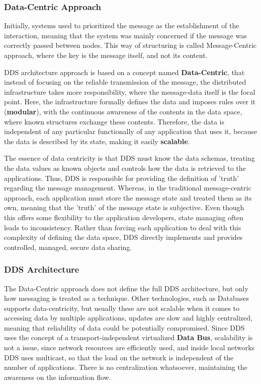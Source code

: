 \subsubsection{Data-Centric Approach}

Initially, systems used to prioritized the message as the establishment of the interaction, meaning that the system was mainly concerned if the message was correctly passed between nodes. This way of structuring is called Message-Centric approach, where the key is the message itself, and not its content.
            
DDS architecture approach is based on a concept named \textbf{Data-Centric}, that instead of focusing on the reliable transmission of the message, the distributed infrastructure takes more responsibility, where the message-data itself is the focal point. Here, the infrastructure formally defines the data and imposes rules over it (\textbf{modular}), with the continuous awareness of the contents in the data space, where known structures exchange these contents. Therefore, the data is independent of any particular functionally of any application that uses it, because the data is described by its state, making it easily \textbf{scalable}.
    
The essence of data centricity is that DDS must know the data schemas, treating the data values as known objects and controls how the data is retrieved to the applications. Thus, DDS is responsible for providing the definition of 'truth' regarding the message management.  Whereas, in the traditional message-centric approach, each application must store the message state and treated them as its own, meaning that the 'truth' of the message state is subjective. Even though this offers some flexibility to the application developers, state managing often leads to inconsistency. Rather than forcing each application to deal with this complexity of defining the data space, DDS directly implements and provides controlled, managed, secure data sharing.

\subsubsection{DDS Architecture}

The Data-Centric approach does not define the full DDS architecture, but only how messaging is treated as a technique. Other technologies, such as Databases supports data-centricity, but usually these are not scalable when it comes to accessing data by multiple applications, updates are slow and highly centralized, meaning that reliability of data could be potentially compromised. Since DDS uses the concept of a transport-independent virtualized \textbf{Data Bus}, scalability is not a issue, since network resources are efficiently used, and inside local networks DDS uses multicast, so that the load on the network is independent of the number of applications. There is no centralization whatsoever, maintaining the awareness on the information flow. 
                
